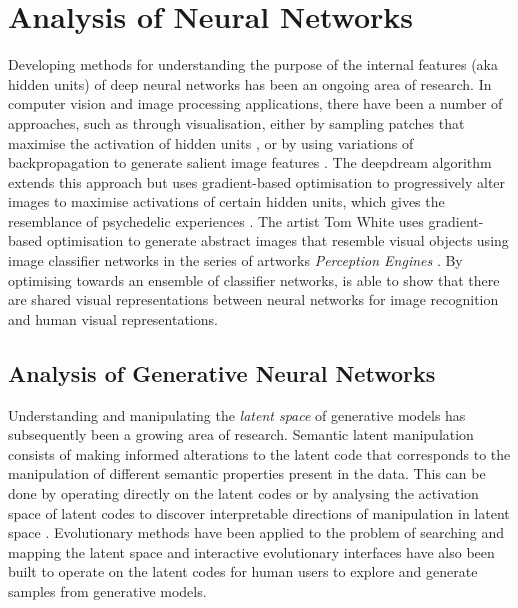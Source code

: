 \section{Analysis of Neural Networks} 

Developing methods for understanding the purpose of the internal features (aka hidden units) of deep neural networks has been an ongoing area of research. 
In computer vision and image processing applications, there have been a number of approaches, such as through visualisation, either by sampling patches that maximise the activation of hidden units \cite{zeiler2014visualizing, zhou2014object}, or by using variations of backpropagation to generate salient image features \cite{zeiler2014visualizing, simonyan2013deep}. 
The deepdream algorithm \citep{mordvintsev2015inceptionism} extends this approach but uses gradient-based optimisation to progressively alter images to maximise activations of certain hidden units, which gives the resemblance of psychedelic experiences \citep{suzuki2017deep}.
The artist Tom White uses gradient-based optimisation to generate abstract images that resemble visual objects using image classifier networks in the series of artworks \textit{Perception Engines} \citep{white2018perception}.
By optimising towards an ensemble of classifier networks, \cite{white2019shared} is able to show that there are shared visual representations between neural networks for image recognition and human visual representations.

\subsection{Analysis of Generative Neural Networks}

Understanding and manipulating the \emph{latent space} of generative models has subsequently been a growing area of research. 
Semantic latent manipulation consists of making informed alterations to the latent code that corresponds to the manipulation of different semantic properties present in the data. 
This can be done by operating directly on the latent codes \citep{brock2016neural, shen2020interpreting} or by analysing the activation space of latent codes to discover interpretable directions of manipulation in latent space \citep{harkonen2020ganspace}. 
Evolutionary methods have been applied to the problem of searching and mapping the latent space \citep{bontrager2018deepmasterprints, fernandes2020evolutionary} and interactive evolutionary interfaces have also been built to operate on the latent codes \citep{Simon-ganbreeder} for human users to explore and generate samples from generative models. 

